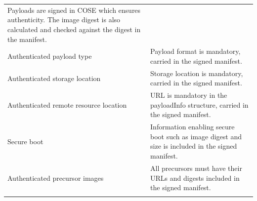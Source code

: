\documentclass[0-thesis.tex]{subfiles}
\begin{document}
\begin{longtable}[]{@{}ll@{}}
\begin{minipage}[t]{0.57\columnwidth}
    Payloads are signed in COSE which ensures authenticity. The image digest
    is also calculated and checked against the digest in the manifest.\strut
    \end{minipage}\tabularnewline
    \begin{minipage}[t]{0.37\columnwidth}\raggedright\strut
    Authenticated payload type\strut
    \end{minipage} & \begin{minipage}[t]{0.57\columnwidth}\raggedright\strut
    Payload format is mandatory, carried in the signed manifest.\strut
    \end{minipage}\tabularnewline
    \begin{minipage}[t]{0.37\columnwidth}\raggedright\strut
    Authenticated storage location\strut
    \end{minipage} & \begin{minipage}[t]{0.57\columnwidth}\raggedright\strut
    Storage location is mandatory, carried in the signed manifest.\strut
    \end{minipage}\tabularnewline
    \begin{minipage}[t]{0.37\columnwidth}\raggedright\strut
    Authenticated remote resource location\strut
    \end{minipage} & \begin{minipage}[t]{0.57\columnwidth}\raggedright\strut
    URL is mandatory in the payloadInfo structure, carried in the signed
    manifest.\strut
    \end{minipage}\tabularnewline
    \begin{minipage}[t]{0.37\columnwidth}\raggedright\strut
    Secure boot\strut
    \end{minipage} & \begin{minipage}[t]{0.57\columnwidth}\raggedright\strut
    Information enabling secure boot such as image digest and size is
    included in the signed manifest.\strut
    \end{minipage}\tabularnewline
    \begin{minipage}[t]{0.37\columnwidth}\raggedright\strut
    Authenticated precursor images\strut
    \end{minipage} & \begin{minipage}[t]{0.57\columnwidth}\raggedright\strut
    All precursors must have their URLs and digests included in the signed
    manifest.\strut
    \end{minipage}\tabularnewline
    \begin{minipage}[t]{0.37\columnwidth}\raggedright\strut

\end{minipage}
\end{longtable}
\end{document}
